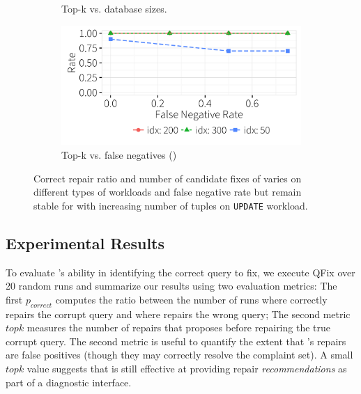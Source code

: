 \begin{figure}[t]
\begin{subfigure} [t]{.3\textwidth}
    \vspace*{-.25in}
    \caption{Top-k vs. database sizes. }
    \vspace*{-.1in}
    \label{f:dbsizecount} 
    \end{subfigure}
    \begin{subfigure} [t]{.3\textwidth}
    \includegraphics[width = .99\columnwidth]{figures/noise_fn_acc_idx}
    \vspace*{-.25in}
    \caption{Top-k vs. false negatives (\color{red}{not complete!})}
    \vspace*{-.1in}
    \label{f:fnfixcount} 
    \end{subfigure}
   \caption{Correct repair ratio and number of candidate fixes of \sys varies on different types of workloads and false negative rate but remain 
   stable for with increasing number of tuples on \texttt{UPDATE} workload.}
   \vspace*{-.1in}
   \label{fig:truerate}
  \end{figure}


\subsection{Experimental Results}
To evaluate \sys's ability in identifying the correct query to fix, we execute QFix over 20 random runs and summarize our results using two evaluation metrics:
The first $p_{correct}$ computes the ratio between the number of runs where \sys correctly repairs the corrupt query and where \sys
repairs the wrong query; The second metric $topk$ measures the number of repairs that \sys proposes before repairing the true corrupt query.
The second metric is useful to quantify the extent that \sys's repairs are false positives (though they may correctly resolve the complaint set).
A small $topk$ value suggests that \sys is still effective at providing repair \emph{recommendations} as part of a diagnostic interface.

